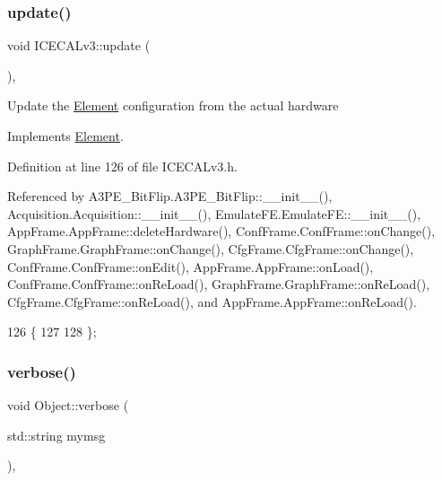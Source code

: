 \subsubsection{\texorpdfstring{update()}{update()}}
{\footnotesize\ttfamily void I\+C\+E\+C\+A\+Lv3\+::update (\begin{DoxyParamCaption}{ }\end{DoxyParamCaption})\hspace{0.3cm}{\ttfamily [inline]}, {\ttfamily [virtual]}}

Update the \hyperlink{classElement}{Element} configuration from the actual hardware 

Implements \hyperlink{classElement_a4e6c83efae95616ebddd03c793a26661}{Element}.



Definition at line 126 of file I\+C\+E\+C\+A\+Lv3.\+h.



Referenced by A3\+P\+E\+\_\+\+Bit\+Flip.\+A3\+P\+E\+\_\+\+Bit\+Flip\+::\+\_\+\+\_\+init\+\_\+\+\_\+(), Acquisition.\+Acquisition\+::\+\_\+\+\_\+init\+\_\+\+\_\+(), Emulate\+F\+E.\+Emulate\+F\+E\+::\+\_\+\+\_\+init\+\_\+\+\_\+(), App\+Frame.\+App\+Frame\+::delete\+Hardware(), Conf\+Frame.\+Conf\+Frame\+::on\+Change(), Graph\+Frame.\+Graph\+Frame\+::on\+Change(), Cfg\+Frame.\+Cfg\+Frame\+::on\+Change(), Conf\+Frame.\+Conf\+Frame\+::on\+Edit(), App\+Frame.\+App\+Frame\+::on\+Load(), Conf\+Frame.\+Conf\+Frame\+::on\+Re\+Load(), Graph\+Frame.\+Graph\+Frame\+::on\+Re\+Load(), Cfg\+Frame.\+Cfg\+Frame\+::on\+Re\+Load(), and App\+Frame.\+App\+Frame\+::on\+Re\+Load().


\begin{DoxyCode}
126                  \{
127     
128   \};
\end{DoxyCode}
\mbox{\label{classObject_a83d2db2df682907ea1115ad721c1c4a1}} 
\subsubsection{\texorpdfstring{verbose()}{verbose()}\hspace{0.1cm}{\footnotesize\ttfamily [1/2]}}
{\footnotesize\ttfamily void Object\+::verbose (\begin{DoxyParamCaption}\item[{std\+::string}]{mymsg }\end{DoxyParamCaption})\hspace{0.3cm}{\ttfamily [inline]}, {\ttfamily [inherited]}}



